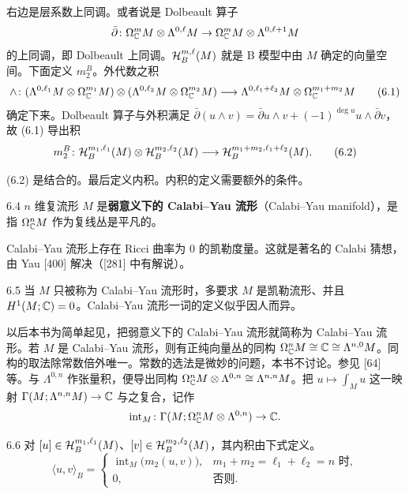 右边是层系数上同调。或者说是 Dolbeault 算子
\[
  \bar\partial\colon\Omega^m_{\mathbb{C}} M\otimes\Lambda^{0,\ell}M\to\Omega^m_{\mathbb{C}} M\otimes\Lambda^{0,\ell+1}M
\]
的上同调，即 Dolbeault 上同调。$\mathcal{H}_B^{m,\ell}(M)$ 就是 B 模型中由 $M$ 确定的向量空间。下面定义 $m_2^B$。外代数之积
\begin{equation}
  \wedge\colon(\Lambda^{0,\ell_1}M\otimes\Omega^{m_1}_{\mathbb{C}} M)\otimes(\Lambda^{0,\ell_2}M\otimes\Omega^{m_2}_{\mathbb{C}} M)
  \longrightarrow\Lambda^{0,\ell_1+\ell_2}M\otimes\Omega^{m_1+m_2}_{\mathbb{C}} M \tag{6.1}
\end{equation}
确定下来。Dolbeault 算子与外积满足 $\bar\partial(u\wedge v)=\bar\partial u\wedge v+(-1)^{\deg u}u\wedge\bar\partial v$，故 (6.1) 导出积
\begin{equation}
  m_2^B\colon\mathcal{H}_B^{m_1,\ell_1}(M)\otimes\mathcal{H}_B^{m_2,\ell_2}(M)\longrightarrow\mathcal{H}_B^{m_1+m_2,\ell_1+\ell_2}(M). \tag{6.2}
\end{equation}

(6.2) 是结合的。最后定义内积。内积的定义需要额外的条件。

\begin{definition}{6.4}
  $n$ 维复流形 $M$ 是\textbf{弱意义下的 Calabi–Yau 流形}（Calabi–Yau manifold），是指 $\Omega^n_{\mathbb{C}} M$ 作为复线丛是平凡的。
\end{definition}

Calabi–Yau 流形上存在 Ricci 曲率为 0 的凯勒度量。这就是著名的 Calabi 猜想，由 Yau [400] 解决（[281] 中有解说）。

\begin{remark}{6.5}
  当 $M$ 只被称为 Calabi–Yau 流形时，多要求 $M$ 是凯勒流形、并且 $H^1(M;\mathbb{C})=0$。Calabi–Yau 流形一词的定义似乎因人而异。
\end{remark}

以后本书为简单起见，把弱意义下的 Calabi–Yau 流形就简称为 Calabi–Yau 流形。若 $M$ 是 Calabi–Yau 流形，则有正纯向量丛的同构 $\Omega^n_{\mathbb{C}} M\cong\mathbb{C}\cong\Lambda^{n,0}M$。同构的取法除常数倍外唯一。常数的选法是微妙的问题，本书不讨论。参见 [64] 等。与 $\Lambda^{0,n}$ 作张量积，便导出同构 $\Omega^n_{\mathbb{C}} M\otimes\Lambda^{0,n}\cong\Lambda^{n,n}M$。把 $u\mapsto\int_Mu$ 这一映射 $\Gamma(M;\Lambda^{n,n}M)\to\mathbb{C}$ 与之复合，记作
\[
  \operatorname{int}_M\colon\Gamma(M;\Omega^n_{\mathbb{C}} M\otimes\Lambda^{0,n})\to\mathbb{C}.
\]

\begin{definition}{6.6}
  对 $[u]\in\mathcal{H}_B^{m_1,\ell_1}(M)$、$[v]\in\mathcal{H}_B^{m_2,\ell_2}(M)$，其内积由下式定义。
  \[
    \langle u,v\rangle_B=
    \begin{cases}
      \operatorname{int}_M\bigl(m_2(u,v)\bigr), & m_1+m_2=\ell_1+\ell_2=n\text{ 时},\\
      0, & \text{否则}.
    \end{cases}
  \]
\end{definition}

